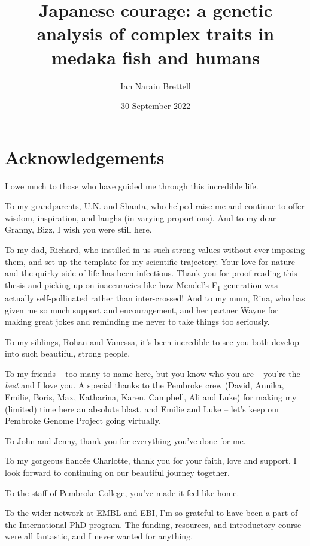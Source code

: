 \documentclass[
]{book}
\title{Japanese courage: a genetic analysis of complex traits in medaka fish and humans}
\author{Ian Narain Brettell}
\date{30 September 2022}
\begin{document}
\maketitle

{
\setcounter{tocdepth}{1}
\tableofcontents
}
\hypertarget{acknowledgements}{%
\chapter*{Acknowledgements}\label{acknowledgements}}

I owe much to those who have guided me through this incredible life.

To my grandparents, U.N. and Shanta, who helped raise me and continue to offer wisdom, inspiration, and laughs (in varying proportions). And to my dear Granny, Bizz, I wish you were still here.

To my dad, Richard, who instilled in us such strong values without ever imposing them, and set up the template for my scientific trajectory. Your love for nature and the quirky side of life has been infectious. Thank you for proof-reading this thesis and picking up on inaccuracies like how Mendel's F\textsubscript{1} generation was actually self-pollinated rather than inter-crossed! And to my mum, Rina, who has given me so much support and encouragement, and her partner Wayne for making great jokes and reminding me never to take things too seriously.

To my siblings, Rohan and Vanessa, it's been incredible to see you both develop into such beautiful, strong people.

To my friends -- too many to name here, but you know who you are -- you're the \emph{best} and I love you. A special thanks to the Pembroke crew (David, Annika, Emilie, Boris, Max, Katharina, Karen, Campbell, Ali and Luke) for making my (limited) time here an absolute blast, and Emilie and Luke -- let's keep our Pembroke Genome Project going virtually.

To John and Jenny, thank you for everything you've done for me.

To my gorgeous fiancée Charlotte, thank you for your faith, love and support. I look forward to continuing on our beautiful journey together.

To the staff of Pembroke College, you've made it feel like home.

To the wider network at EMBL and EBI, I'm so grateful to have been a part of the International PhD program. The funding, resources, and introductory course were all fantastic, and I never wanted for anything.
\end{document}
